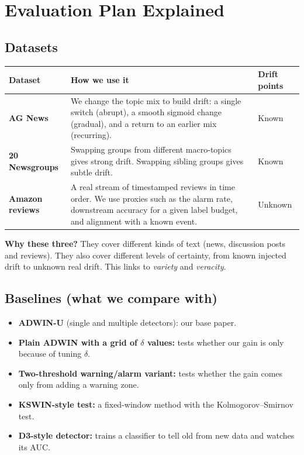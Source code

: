 \documentclass[11pt,a4paper]{article}
\begin{document}
\section{Evaluation Plan Explained}

\subsection{Datasets}

\begin{center}
\small
\begin{tabular}{@{}>{\bfseries}p{2.8cm}p{7.6cm}p{2.4cm}@{}}
\toprule
Dataset & How we use it & Drift points \\
\midrule
AG News & We change the topic mix to build drift: a single switch (abrupt), a smooth sigmoid change (gradual), and a return to an earlier mix (recurring). & Known \\
20 Newsgroups & Swapping groups from different macro-topics gives strong drift. Swapping sibling groups gives subtle drift. & Known \\
Amazon reviews & A real stream of timestamped reviews in time order. We use proxies such as the alarm rate, downstream accuracy for a given label budget, and alignment with a known event. & Unknown \\
\bottomrule
\end{tabular}
\end{center}

\textbf{Why these three?} They cover different kinds of text (news, discussion posts and reviews). They also cover different levels of certainty, from known injected drift to unknown real drift. This links to \emph{variety} and \emph{veracity}.

\subsection{Baselines (what we compare with)}
\begin{itemize}
  \item \textbf{ADWIN-U} (single and multiple detectors): our base paper.
  \item \textbf{Plain ADWIN with a grid of $\delta$ values:} tests whether our gain is only because of tuning $\delta$.
  \item \textbf{Two-threshold warning/alarm variant:} tests whether the gain comes only from adding a warning zone.
  \item \textbf{KSWIN-style test:} a fixed-window method with the Kolmogorov--Smirnov test.
  \item \textbf{D3-style detector:} trains a classifier to tell old from new data and watches its AUC.
\end{itemize}
\end{document}
